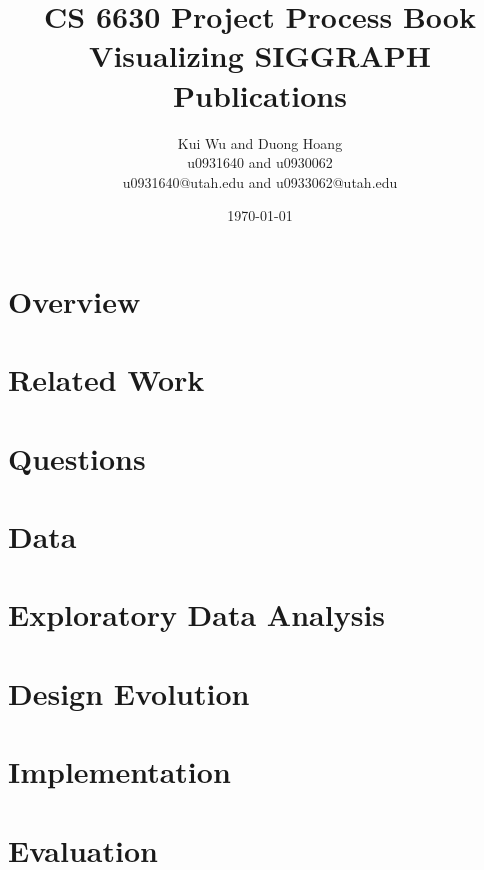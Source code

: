 \documentclass[12pt]{article}
\begin{document}

\title{CS 6630 Project Process Book\\Visualizing SIGGRAPH Publications}
\author{Kui Wu and Duong Hoang\\u0931640 and u0930062\\u0931640@utah.edu and u0933062@utah.edu}
\date{\today}


\maketitle

\section{Overview}


\section{Related Work}


\section{Questions}


\section{Data}


\section{Exploratory Data Analysis}


\section{Design Evolution}
 

\section{Implementation}


\section{Evaluation}

\end{document}
